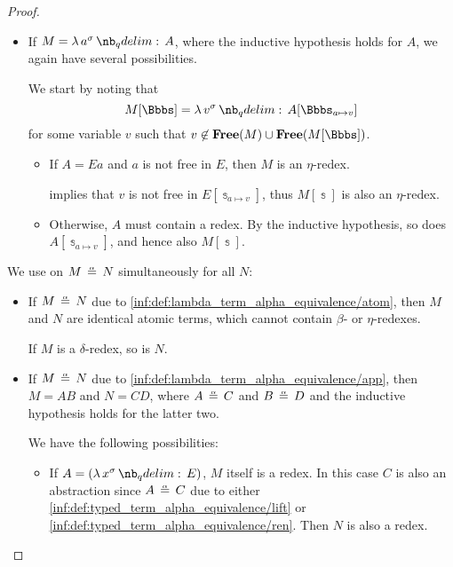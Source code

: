 \begin{proof}
\begin{itemize}
    \item If \( M = \qabs {a^\sigma} A \), where the inductive hypothesis holds for \( A \), we again have several possibilities.

    We start by noting that
    \begin{equation*}
      M[\Bbbs] = \qabs {v^\sigma} A[\Bbbs_{a \mapsto v}]
    \end{equation*}
    for some variable \( v \) such that \( v \not\in \op*{Free}(M) \cup \op*{Free}(M[\Bbbs]) \).

    \begin{itemize}
      \item If \( A = Ea \) and \( a \) is not free in \( E \), then \( M \) is an \( \eta \)-redex.

       implies that \( v \) is not free in \( E[\Bbbs_{a \mapsto v}] \), thus \( M[\Bbbs] \) is also an \( \eta \)-redex.

      \item Otherwise, \( A \) must contain a redex. By the inductive hypothesis, so does \( A[\Bbbs_{a \mapsto v}] \), and hence also \( M[\Bbbs] \).
    \end{itemize}
  \end{itemize}

   We use  on \( M \aequiv N \) simultaneously for all \( N \):
  \begin{itemize}
    \item If \( M \aequiv N \) due to \ref{inf:def:lambda_term_alpha_equivalence/atom}, then \( M \) and \( N \) are identical atomic terms, which cannot contain \( \beta \)- or \( \eta \)-redexes.

    If \( M \) is a \( \delta \)-redex, so is \( N \).

    \item If \( M \aequiv N \) due to \ref{inf:def:lambda_term_alpha_equivalence/app}, then \( M = AB \) and \( N = CD \), where \( A \aequiv C \) and \( B \aequiv D \) and the inductive hypothesis holds for the latter two.

    We have the following possibilities:
    \begin{itemize}
      \item If \( A = (\qabs {x^\sigma} E) \), \( M \) itself is a redex. In this case \( C \) is also an abstraction since \( A \aequiv C \) due to either \ref{inf:def:typed_term_alpha_equivalence/lift} or \ref{inf:def:typed_term_alpha_equivalence/ren}. Then \( N \) is also a redex.


\end{itemize}
\end{itemize}
\end{proof}
